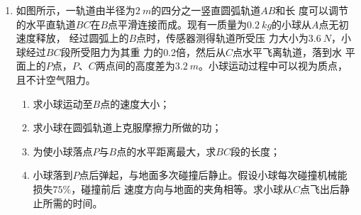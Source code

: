 \begin{enumerate}
\begin{enumerate}
\end{enumerate}
\begin{figure}[h!]
\flushright

\end{figure}




\newpage
\item 
{}
如图所示，一轨道由半径为$ 2 \ m $的四分之一竖直圆弧轨道$ AB $和长
度可以调节的水平直轨道$ BC $在$ B $点平滑连接而成。现有一质量为$ 0.2 \ kg $的小球从$ A $点无初速度释放，
经过圆弧上的$ B $点时，传感器测得轨道所受压
力大小为$ 3.6 \ N $，小球经过$ BC $段所受阻力为其重
力的$ 0.2 $倍，然后从$ C $点水平飞离轨道，落到水
平面上的$ P $点，$ P $、$ C $两点间的高度差为$ 3.2 \ m $。小球运动过程中可以视为质点，且不计空气阻力。
\begin{enumerate}
\renewcommand{\labelenumi}{\arabic{enumi}.}
\item
求小球运动至$ B $点的速度大小；
\item 
求小球在圆弧轨道上克服摩擦力所做的功；
\item 
为使小球落点$ P $与$ B $点的水平距离最大，求$ BC $段的长度；
\item 
小球落到$ P $点后弹起，与地面多次碰撞后静止。假设小球每次碰撞机械能损失$ 75 \% $，碰撞前后
速度方向与地面的夹角相等。求小球从$ C $点飞出后静止所需的时间。



\end{enumerate}
\begin{figure}[h!]
\flushright

\end{figure}


\end{enumerate}
